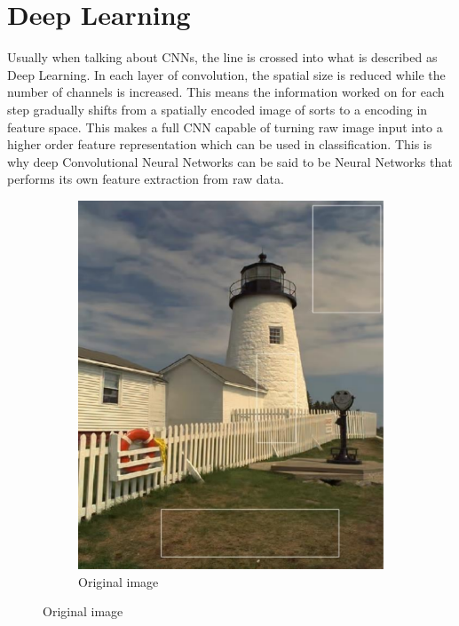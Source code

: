 \section{Deep Learning}
Usually when talking about CNNs, the line is crossed into what is described as Deep Learning. In each layer of convolution, the spatial size is reduced while the number of channels is increased. This means the information worked on for each step gradually shifts from a spatially encoded image of sorts to a encoding in feature space. This makes a full CNN capable of turning raw image input into a higher order feature representation which can be used in classification. This is why deep Convolutional Neural Networks can be said to be Neural Networks that performs its own feature extraction from raw data.

\begin{figure}
    \begin{subfigure}[h]{0.49\linewidth}
        \includegraphics[width=\linewidth]{Chapters/2.Background/figures/original.png}
        \caption{Original image}
    \end{subfigure}

\end{figure}
